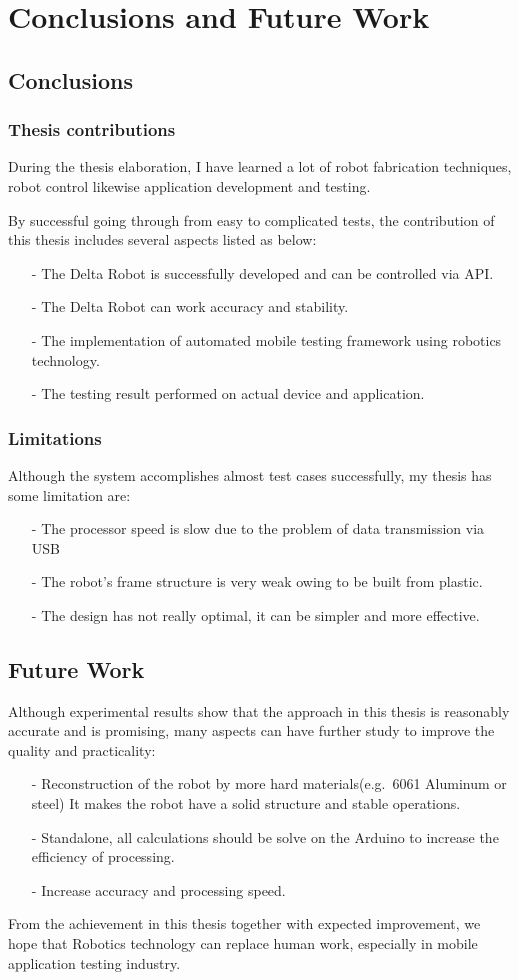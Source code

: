 \chapter{Conclusions and Future Work}

\section{Conclusions}
	\subsection{Thesis contributions}
	During the thesis elaboration, I have learned a lot of robot fabrication techniques, robot control likewise application development and testing.

	By successful going through from easy to complicated tests, the contribution of this thesis includes several aspects listed as below:
	\begin{itemize}
		\item[-] The Delta Robot is successfully developed and can be controlled via API.
		\item[-] The Delta Robot can work accuracy and stability.
		\item[-] The implementation of automated mobile testing framework using robotics technology.
		\item[-] The testing result performed on actual device and application.
	\end{itemize}
	\subsection{Limitations}
	Although the system accomplishes almost test cases successfully, my thesis has some limitation are:
	\begin{itemize}
		\item[-] The processor speed is slow due to the problem of data transmission via USB
		\item[-] The robot's frame structure is very weak owing to be built from plastic.
		\item[-] The design has not really optimal, it can be simpler and more effective.
	\end{itemize}

\section{Future Work}
	
	Although experimental results show that the approach in this thesis is reasonably accurate and is promising, many aspects can have further study to improve the quality and practicality:
	\begin{itemize}
		\item[-] Reconstruction of the robot by more hard materials(e.g.\ 6061 Aluminum or steel) It makes the robot have a solid structure and stable operations.
		\item[-] Standalone, all calculations should be solve on the Arduino to increase the efficiency of processing.
		\item[-] Increase accuracy and processing speed.
	\end{itemize}

	From the achievement in this thesis together with expected improvement, we hope that Robotics technology can replace human work, especially in mobile application testing industry.
